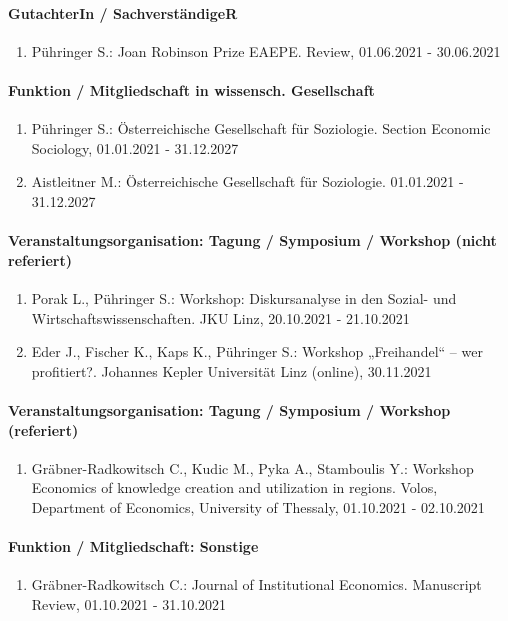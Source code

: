 \paragraph{GutachterIn / SachverständigeR} 
\begin{enumerate}[leftmargin=*, labelsep=0.5cm] 
 	 \item Pühringer S.: Joan Robinson Prize EAEPE. Review, 01.06.2021 - 30.06.2021 
\end{enumerate} 
\paragraph{Funktion / Mitgliedschaft in wissensch. Gesellschaft} 
\begin{enumerate}[leftmargin=*, labelsep=0.5cm] 
 	 \item Pühringer S.: Österreichische Gesellschaft für Soziologie. Section Economic Sociology, 01.01.2021 - 31.12.2027 
	 \item Aistleitner M.: Österreichische Gesellschaft für Soziologie. 01.01.2021 - 31.12.2027 
\end{enumerate} 
\paragraph{Veranstaltungsorganisation: Tagung / Symposium / Workshop (nicht referiert)} 
\begin{enumerate}[leftmargin=*, labelsep=0.5cm] 
 	 \item Porak L., Pühringer S.: Workshop: Diskursanalyse in den Sozial- und Wirtschaftswissenschaften. JKU Linz, 20.10.2021 - 21.10.2021 
	 \item Eder J., Fischer K., Kaps K., Pühringer S.: Workshop „Freihandel“ – wer profitiert?. Johannes Kepler Universität Linz (online), 30.11.2021 
\end{enumerate} 
\paragraph{Veranstaltungsorganisation: Tagung / Symposium / Workshop (referiert)} 
\begin{enumerate}[leftmargin=*, labelsep=0.5cm] 
 	 \item Gräbner-Radkowitsch C., Kudic M., Pyka A., Stamboulis Y.: Workshop Economics of knowledge creation and utilization in regions. Volos, Department of Economics, University of Thessaly, 01.10.2021 - 02.10.2021 
\end{enumerate} 
\paragraph{Funktion / Mitgliedschaft: Sonstige} 
\begin{enumerate}[leftmargin=*, labelsep=0.5cm] 
 	 \item Gräbner-Radkowitsch C.: Journal of Institutional Economics. Manuscript Review, 01.10.2021 - 31.10.2021 
\end{enumerate} 
